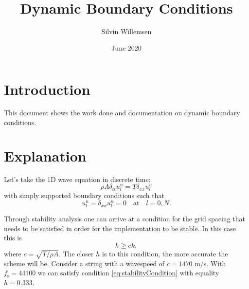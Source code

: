 \documentclass[dvipsnames]{article}
\title{Dynamic Boundary Conditions}
\author{Silvin Willemsen}
\date{June 2020}
\begin{document}
\maketitle

\section{Introduction}
This document shows the work done and documentation on dynamic boundary conditions.
 
\section{Explanation}
Let's take the 1D wave equation in discrete time:
\begin{equation}
    \rho A\delta_{tt}u_l^n=T\delta_{xx}u_l^n
\end{equation}
with simply supported boundary conditions such that
\begin{equation}\label{eq:1Dwave}
u_l^n = \delta_{xx}u_l^n = 0 \quad \text{at} \quad l = 0, N.
\end{equation}

Through stability analysis one can arrive at a condition for the grid spacing that needs to be satisfied in order for the implementation to be stable. In this case this is
\begin{equation}\label{eq:stabilityCondition}
    h \geq ck,
\end{equation}
where $c = \sqrt{T/\rho A}$. The closer $h$ is to this condition, the more accurate the scheme will be. 
Consider a string with a wavespeed of $c = 1470$ m/s. With $f_\text{s} = 44100$ we can satisfy condition \eqref{eq:stabilityCondition} with equality $h = 0.333$.
\end{document}
